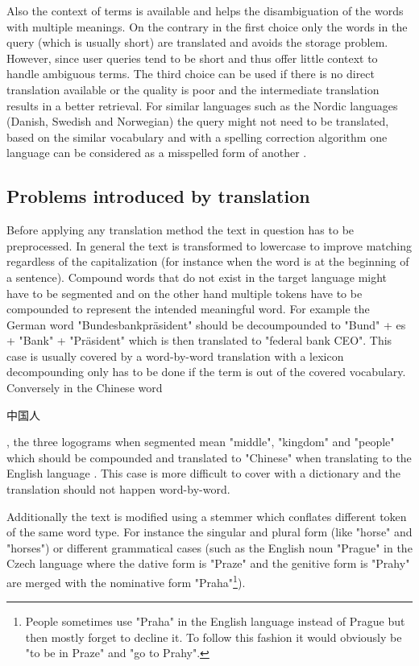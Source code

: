 \documentclass[journal]{IEEEtran}
\begin{document}
Also the context of terms is available and helps the disambiguation of the words with multiple meanings.
On the contrary in the first choice only the words in the query (which is usually short) are translated and avoids the storage problem.
However, since user queries tend to be short and thus offer little context to handle ambiguous terms.
The third choice can be used if there is no direct translation available or the quality is poor and the intermediate translation results in a better retrieval.
For similar languages such as the Nordic languages (Danish, Swedish and Norwegian) the query might not need to be translated, based on the similar vocabulary and with a spelling correction algorithm one language can be considered as a misspelled form of another \cite{peters12}.

\subsection{Problems introduced by translation}
\label{sec:problems}
Before applying any translation method the text in question has to be preprocessed.
In general the text is transformed to lowercase to improve matching regardless of the capitalization (for instance when the word is at the beginning of a sentence).
Compound words that do not exist in the target language might have to be segmented and on the other hand multiple tokens have to be compounded to represent the intended meaningful word.
For example the German word "Bundesbankpr\"{a}sident" should be decoumpounded to "Bund" + es + "Bank" + "Pr\"{a}sident" which is then translated to "federal bank CEO".
This case is usually covered by a word-by-word translation with a lexicon decompounding only has to be done if the term is out of the covered vocabulary.
Conversely in the Chinese word \begin{CJK}{UTF8}{gbsn}中国人\end{CJK}, the three logograms when segmented mean "middle", "kingdom" and "people" which should be compounded and translated to "Chinese" when translating to the English language \cite{ir13}.
This case is more difficult to cover with a dictionary and the translation should not happen word-by-word.

Additionally the text is modified using a stemmer which conflates different token of the same word type.
For instance the singular and plural form (like "horse" and "horses") or different grammatical cases (such as the English noun "Prague" in the Czech language where the dative form is "Praze" and the genitive form is "Prahy" are merged with the nominative form "Praha"\footnote{People sometimes use "Praha" in the English language instead of Prague but then mostly forget to decline it.
To follow this fashion it would obviously be "to be in Praze" and "go to Prahy".}).
\end{document}

